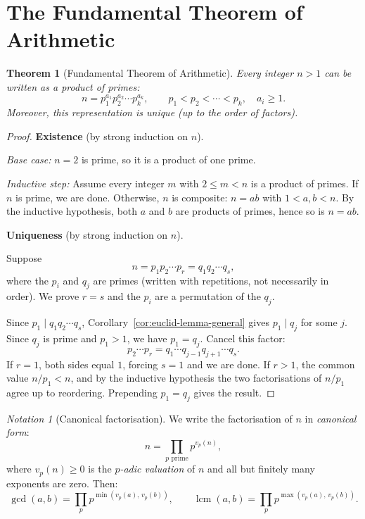 \documentclass[12pt,a4paper,openany]{book}
\theoremstyle{definition}
\theoremstyle{plain}
\newtheorem{theorem}[definition]{Theorem}
\theoremstyle{remark}
\newtheorem{notation}[definition]{Notation}
\DeclareMathOperator{\lcm}{lcm}
\begin{document}
\section{The Fundamental Theorem of Arithmetic}
\label{sec:fta}

\begin{theorem}[Fundamental Theorem of Arithmetic]
\label{thm:fta}
Every integer $n > 1$ can be written as a product of primes:
\[
  n = p_1^{a_1} p_2^{a_2} \cdots p_k^{a_k},
  \qquad p_1 < p_2 < \cdots < p_k, \quad a_i \ge 1.
\]
Moreover, this representation is \emph{unique} (up to the order of factors).
\end{theorem}

\begin{proof}
\textbf{Existence}
(by strong induction on $n$).

\emph{Base case:} $n = 2$ is prime, so it is a product of one prime.

\emph{Inductive step:} Assume every integer $m$ with $2 \le m < n$ is a product
of primes. If $n$ is prime, we are done. Otherwise, $n$ is composite:
$n = ab$ with $1 < a, b < n$. By the inductive hypothesis, both $a$ and $b$ are
products of primes, hence so is $n = ab$.

\medskip
\textbf{Uniqueness}
(by strong induction on $n$).

Suppose
\[
  n = p_1 p_2 \cdots p_r = q_1 q_2 \cdots q_s,
\]
where the $p_i$ and $q_j$ are primes (written with repetitions, not necessarily
in order). We prove $r = s$ and the $p_i$ are a permutation of the $q_j$.

Since $p_1 \mid q_1 q_2 \cdots q_s$, Corollary~\ref{cor:euclid-lemma-general}
gives $p_1 \mid q_j$ for some $j$. Since $q_j$ is prime and $p_1 > 1$, we have
$p_1 = q_j$. Cancel this factor:
\[
  p_2 \cdots p_r = q_1 \cdots q_{j-1} q_{j+1} \cdots q_s.
\]
If $r = 1$, both sides equal $1$, forcing $s = 1$ and we are done.
If $r > 1$, the common value $n/p_1 < n$, and by the inductive hypothesis
the two factorisations of $n/p_1$ agree up to reordering. Prepending $p_1 = q_j$
gives the result.
\end{proof}

\begin{notation}[Canonical factorisation]
\label{not:canonical}
We write the factorisation of $n$ in \emph{canonical form}:
\[
  n = \prod_{p \text{ prime}} p^{v_p(n)},
\]
where $v_p(n) \ge 0$ is the \emph{$p$-adic valuation} of $n$ and all but
finitely many exponents are zero. Then:
\[
  \gcd(a,b) = \prod_p p^{\min(v_p(a),\, v_p(b))},
  \qquad
  \lcm(a,b) = \prod_p p^{\max(v_p(a),\, v_p(b))}.
\]
\end{notation}
\end{document}
